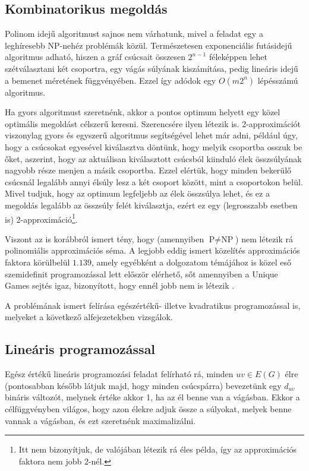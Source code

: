 \subsection{Kombinatorikus megoldás}\label{sec:theoryMaxCutComb}

Polinom idejű algoritmust sajnos nem várhatunk, mivel a feladat egy a leghíresebb NP-nehéz problémák közül. Természetesen exponenciális futásidejű algoritmus adható, hiszen a gráf csúcsait összesen $2^{n-1}$ féleképpen lehet szétválasztani két csoportra, egy vágás súlyának kiszámítása, pedig lineáris idejű a bemenet méretének függvényében. Ezzel így adódok egy $O(m 2^n)$ lépésszámú algoritmus.

Ha gyors algoritmust szeretnénk, akkor a pontos optimum helyett egy közel optimális megoldást célszerű keresni. Szerencsére ilyen létezik is. 2-approximációt viszonylag gyors és egyszerű algoritmus segítségével lehet már adni, például úgy, hogy a csúcsokat egyesével kiválasztva döntünk, hogy melyik csoportba osszuk be őket, aszerint, hogy az aktuálisan kiválasztott csúcsból kiinduló élek összsúlyának nagyobb része menjen a másik csoportba. Ezzel elértük, hogy minden bekerülő csúcsnál legalább annyi élsúly lesz a két csoport között, mint a csoportokon belül. Mivel tudjuk, hogy az optimum legfeljebb az élek összsúlya lehet, és ez a megoldás legalább az összsúly felét kiválasztja, ezért ez egy (legrosszabb esetben is) 2-approximáció\footnote{Itt nem bizonyítjuk, de valójában létezik rá éles példa, így az approximációs faktora nem jobb 2-nél.}.

Viszont az is korábbról ismert tény, hogy (amennyiben $\text{P} \neq \text{NP}$) nem létezik rá polinomiális approximációs séma. A legjobb eddig ismert közelítés approximációs faktora körülbelül $1.139$, amely egyébként a dolgozatom témájához is közel eső szemidefinit programozással lett először elérhető, sőt amennyiben a Unique Games sejtés igaz, bizonyított, hogy ennél jobb nem is létezik \cite{10.1145/227683.227684, wiki:Maximum_cut}.

A problémának ismert felírása egészértékű- illetve kvadratikus programozással is, melyeket a következő alfejezetekben vizsgálok.

\subsection{Lineáris programozással}\label{sec:theoryMaxCutLP}

Egész értékű lineáris programozási feladat felírható rá, minden $uv \in E(G)$ élre (pontosabban később látjuk majd, hogy minden csúcspárra) bevezetünk egy $d_{uv}$ bináris változót, melynek értéke akkor 1, ha az él benne van a vágásban. Ekkor a célfüggvényben világos, hogy azon élekre adjuk össze a súlyokat, melyek benne vannak a vágásban, és ezt szeretnénk maximalizálni.

